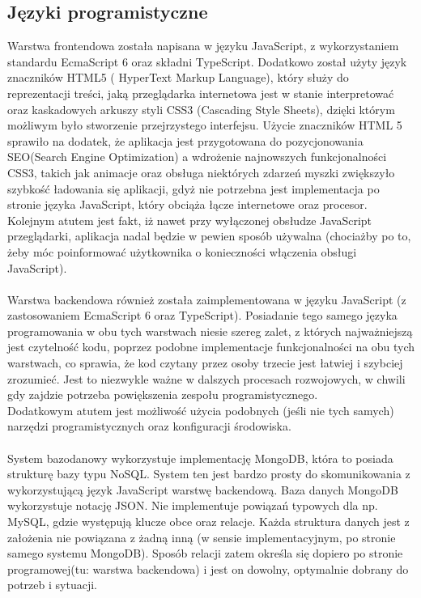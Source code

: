 \documentclass[eng,printmode]{mgr}
\begin{document}
\subsection{Języki programistyczne}
Warstwa frontendowa została napisana w języku JavaScript\cite{JS}, z wykorzystaniem standardu EcmaScript 6\cite{ES6} oraz składni TypeScript\cite{TS}. Dodatkowo został użyty język znaczników HTML5 ( HyperText Markup Language)\cite{HTML5}, który służy do reprezentacji treści, jaką przeglądarka internetowa jest w stanie interpretować oraz kaskadowych arkuszy styli CSS3 (Cascading Style Sheets)\cite{CSS3}, dzięki którym możliwym było stworzenie przejrzystego interfejsu. Użycie znaczników HTML 5 sprawiło na dodatek, że aplikacja jest przygotowana do pozycjonowania SEO(Search Engine Optimization)\cite{HTML_SEO} a wdrożenie najnowszych funkcjonalności CSS3, takich jak animacje oraz obsługa niektórych zdarzeń myszki zwiększyło szybkość ładowania się aplikacji, gdyż nie potrzebna jest implementacja po stronie języka JavaScript, który obciąża łącze internetowe oraz procesor\cite{JS_CPU}. Kolejnym atutem jest fakt, iż nawet przy wyłączonej obsłudze JavaScript przeglądarki, aplikacja nadal będzie w pewien sposób używalna (chociażby po to, żeby móc poinformować użytkownika o konieczności włączenia obsługi JavaScript).
\\
\\
Warstwa backendowa również została zaimplementowana w języku JavaScript (z zastosowaniem EcmaScript 6 oraz TypeScript). Posiadanie tego samego języka programowania w obu tych warstwach niesie szereg zalet, z których najważniejszą jest czytelność kodu, poprzez podobne implementacje funkcjonalności na obu tych warstwach, co sprawia, że kod czytany przez osoby trzecie jest łatwiej i szybciej zrozumieć. Jest to niezwykle ważne w dalszych procesach rozwojowych, w chwili gdy zajdzie potrzeba powiększenia zespołu programistycznego.
\\
Dodatkowym atutem jest możliwość użycia podobnych (jeśli nie tych samych) narzędzi programistycznych oraz konfiguracji środowiska.
\\
\\
System bazodanowy wykorzystuje implementację MongoDB\cite{MongoDB}, która to posiada strukturę bazy typu NoSQL\cite{NO_SQL}. System ten jest bardzo prosty do skomunikowania z wykorzystującą język JavaScript warstwę backendową. Baza danych MongoDB wykorzystuje notację JSON. Nie implementuje powiązań typowych dla np. MySQL, gdzie występują klucze obce oraz relacje. Każda struktura danych jest z założenia nie powiązana z żadną inną (w sensie implementacyjnym, po stronie samego systemu MongoDB). Sposób relacji zatem określa się dopiero po stronie programowej(tu: warstwa backendowa) i jest on dowolny, optymalnie dobrany do potrzeb i sytuacji.
\end{document}
